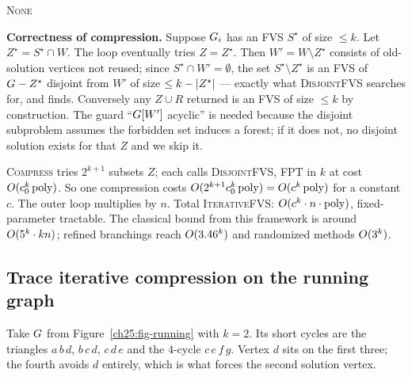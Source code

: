 \begin{algorithm}[H]
\caption{\textsc{Compress}$(\Gph,W,k)$ --- shrink an FVS by guessing its overlap}
\label{ch25:alg-compress}
\DontPrintSemicolon
{}
\Return \textsc{None}\;
\end{algorithm}

\begin{whybox}
\textbf{Correctness of compression.} Suppose $G_i$ has an FVS $S^\star$ of size $\le k$. Let $Z^\star = S^\star\cap W$. The loop eventually tries $Z=Z^\star$. Then $W' = W\setminus Z^\star$ consists of old-solution vertices not reused; since $S^\star\cap W' = \emptyset$, the set $S^\star\setminus Z^\star$ is an FVS of $G - Z^\star$ disjoint from $W'$ of size $\le k-\lvert Z^\star\rvert$ --- exactly what \textsc{DisjointFVS} searches for, and finds. Conversely any $Z\cup R$ returned is an FVS of size $\le k$ by construction. The guard ``$G[W']$ acyclic'' is needed because the disjoint subproblem assumes the forbidden set induces a forest; if it does not, no disjoint solution exists for that $Z$ and we skip it.
\end{whybox}

\begin{complexitybox}
\textsc{Compress} tries $2^{k+1}$ subsets $Z$; each calls \textsc{DisjointFVS}, FPT in $k$ at cost $O(c_0^{k}\operatorname{poly})$. So one compression costs $O(2^{k+1}c_0^{k}\operatorname{poly})=O(c^k\operatorname{poly})$ for a constant $c$. The outer loop multiplies by $n$. Total \textsc{IterativeFVS}: $O(c^{k}\cdot n\cdot\operatorname{poly})$, fixed-parameter tractable. The classical bound from this framework is around $O(5^k\cdot kn)$; refined branchings reach $O(3.46^k)$ and randomized methods $O(3^k)$.
\end{complexitybox}

\subsection{Trace iterative compression on the running graph}

Take $G$ from Figure~\ref{ch25:fig-running} with $k=2$. Its short cycles are the triangles $a\,b\,d$, $b\,c\,d$, $c\,d\,e$ and the $4$-cycle $c\,e\,f\,g$. Vertex $d$ sits on the first three; the fourth avoids $d$ entirely, which is what forces the second solution vertex.

